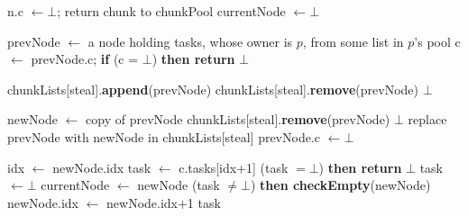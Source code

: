 \begin{algo}[!ht]
\begin{minipage}[t]{0.48\textwidth}
\begin{distribalgo}[1]
\medskip

  	\STATE n.c $\leftarrow \bot$; return chunk to chunkPool
  	\STATE currentNode $\leftarrow \bot$
  \ENDINDENT
\ENDINDENT


\setcounter{alg:non-fifo:lines}{\value{ALC@line}} %
\end{distribalgo}
\end{minipage}%
%
\hfill
%
\begin{minipage}[t]{0.48\textwidth}
%
\begin{distribalgo}[1]
\setcounter{ALC@line}{\value{alg:non-fifo:lines}}
\smallskip

	\STATE prevNode $\leftarrow$ a node holding tasks, whose owner is $p$, from some list in $p$'s pool  \label{alg:line:take-steal-chunk}
	\STATE c $\leftarrow$ prevNode.c; {\bf if} (c = $\bot$) {\bf then return} $\bot$

	\STATE chunkLists[steal].{\bf append}(prevNode)  \label{alg:line:resteal-begin}
	 \label{alg:line:chown}
 		\STATE chunkLists[steal].{\bf remove}(prevNode)
 		 $\bot$ 
	\ENDINDENT

	\smallskip
	\STATE newNode $\leftarrow$ copy of prevNode \label{alg:line:copy-prev-node}
	 \label{alg:line:steal-node-empty}
	  \STATE chunkLists[steal].{\bf remove}(prevNode)
	   $\bot$
	\ENDINDENT
	\STATE replace prevNode with newNode in chunkLists[steal]
	\STATE prevNode.c $\leftarrow \bot$  \label{alg:line:remove-chunk} \label{alg:line:resteal-end}
	
	\smallskip
	\STATE idx $\leftarrow$ newNode.idx
	\STATE task $\leftarrow$ c.tasks[idx+1] 
	 (task $= \bot$) {\bf then return} $\bot$  \label{alg:line:steal-chunk-not-full}
	 \label{alg:line:cas-steal} 
		\STATE task $\leftarrow \bot$
	\ENDINDENT
	\STATE currentNode $\leftarrow$ newNode
	 (task $\neq \bot$) {\bf then checkEmpty}(newNode)
	\STATE newNode.idx $\leftarrow$ newNode.idx+1
	 task
\ENDINDENT

\setcounter{alg:non-fifo:lines}{\value{ALC@line}}
\end{distribalgo}
\end{minipage}
\end{algo}

